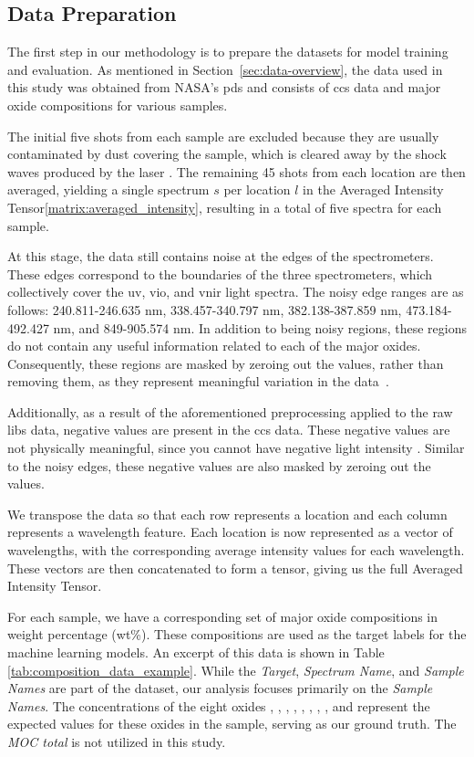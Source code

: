 \subsection{Data Preparation}\label{sec:data-preparation}
The first step in our methodology is to prepare the datasets for model training and evaluation.
As mentioned in Section~\ref{sec:data-overview}, the data used in this study was obtained from NASA's \gls{pds} and consists of \gls{ccs} data and major oxide compositions for various samples.

The initial five shots from each sample are excluded because they are usually contaminated by dust covering the sample, which is cleared away by the shock waves produced by the laser \cite{cleggRecalibrationMarsScience2017}.
The remaining 45 shots from each location are then averaged, yielding a single spectrum $s$ per location $l$ in the Averaged Intensity Tensor\ref{matrix:averaged_intensity}, resulting in a total of five spectra for each sample.

At this stage, the data still contains noise at the edges of the spectrometers.
These edges correspond to the boundaries of the three spectrometers, which collectively cover the \gls{uv}, \gls{vio}, and \gls{vnir} light spectra.
The noisy edge ranges are as follows: 240.811-246.635 nm, 338.457-340.797 nm, 382.138-387.859 nm, 473.184-492.427 nm, and 849-905.574 nm.
In addition to being noisy regions, these regions do not contain any useful information related to each of the major oxides.
Consequently, these regions are masked by zeroing out the values, rather than removing them, as they represent meaningful variation in the data~\cite{cleggRecalibrationMarsScience2017}.

Additionally, as a result of the aforementioned preprocessing applied to the raw \gls{libs} data, negative values are present in the \gls{ccs} data.
These negative values are not physically meaningful, since you cannot have negative light intensity \cite{p9_paper}.
Similar to the noisy edges, these negative values are also masked by zeroing out the values.

We transpose the data so that each row represents a location and each column represents a wavelength feature.
Each location is now represented as a vector of wavelengths, with the corresponding average intensity values for each wavelength.
These vectors are then concatenated to form a tensor, giving us the full Averaged Intensity Tensor.

For each sample, we have a corresponding set of major oxide compositions in weight percentage (wt\%).
These compositions are used as the target labels for the machine learning models.
An excerpt of this data is shown in Table \ref{tab:composition_data_example}.
While the \textit{Target}, \textit{Spectrum Name}, and \textit{Sample Names} are part of the dataset, our analysis focuses primarily on the \textit{Sample Names}.
The concentrations of the eight oxides , , , , , , , , and  represent the expected values for these oxides in the sample, serving as our ground truth. The \textit{MOC total} is not utilized in this study.

